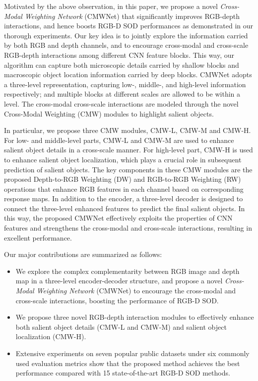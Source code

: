 \documentclass[runningheads]{llncs}
\begin{document}
Motivated by the above observation, in this paper, we propose a novel
\emph{Cross-Modal Weighting Network} (CMWNet)
that significantly improves RGB-depth interactions, and hence boosts RGB-D SOD performances as demonstrated in our thorough experiments.
Our key idea is to jointly explore the information carried by both RGB and depth channels, and to encourage cross-modal and cross-scale RGB-depth interactions among different CNN feature blocks. This way, our algorithm can capture both microscopic details carried by shallow blocks and macroscopic object location information carried by deep blocks.
CMWNet adopts a three-level representation, capturing low-, middle-, and high-level information respectively; and multiple blocks at different scales are allowed to be within a level. The cross-modal cross-scale interactions are modeled through the novel Cross-Modal Weighting (CMW) modules to highlight salient objects.


In particular, we propose three CMW modules, CMW-L, CMW-M and CMW-H.
For low- and middle-level parts, CMW-L and CMW-M are used to enhance salient object details in a cross-scale manner.
For high-level part, CMW-H is used to enhance salient object localization,
which plays a crucial role in subsequent prediction of salient objects.
The key components in these CMW modules are the proposed Depth-to-RGB Weighting (DW) and RGB-to-RGB Weighting (RW) operations that enhance RGB features in each channel  based on corresponding response maps.
In addition to the encoder, a three-level decoder is designed to connect the
three-level enhanced features to predict the final salient objects.
In this way, the proposed CMWNet effectively exploits the properties
of CNN features and strengthens the cross-modal and
cross-scale interactions, resulting in excellent performance.


Our major contributions are summarized as follows:
\begin{itemize}\setlength{\itemsep}{0pt} \setlength{\parsep}{1pt} 	\setlength{\parskip}{1pt}
	\item We explore the complex complementarity between RGB image and depth map
	 in a three-level encoder-decoder structure, and propose a novel \emph{Cross-Modal Weighting Network} (CMWNet) to encourage the cross-modal and cross-scale interactions, boosting the performance of RGB-D SOD.
\item We propose three novel RGB-depth interaction modules to effectively enhance both salient object details (CMW-L and CMW-M) and salient object localization (CMW-H). \item Extensive experiments on seven popular public datasets under six commonly used evaluation metrics show that the proposed method achieves the best performance compared with 15 state-of-the-art RGB-D SOD methods.
\end{itemize}
\end{document}

